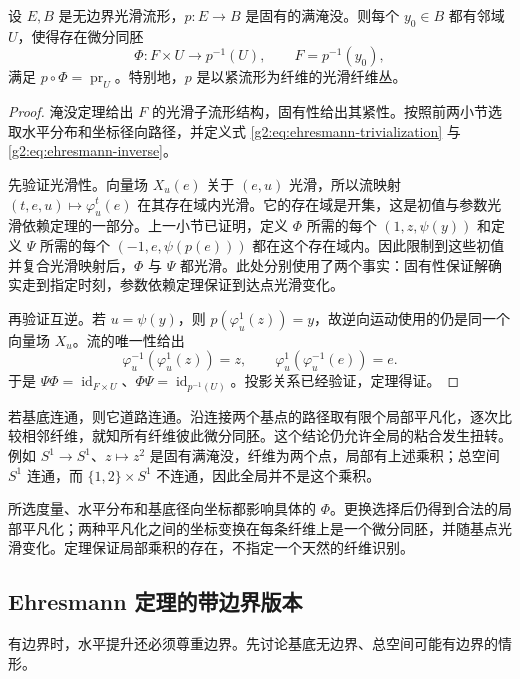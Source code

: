 \begin{theorem}[Ehresmann 定理]\label{g2:thm:ehresmann}
	设 \(E,B\) 是无边界光滑流形，\(p:E\to B\) 是固有的满淹没。则每个 \(y_0\in B\) 都有邻域 \(U\)，使得存在微分同胚
	\[
		\Phi:F\times U\longrightarrow p^{-1}(U),\qquad F=p^{-1}(y_0),
	\]
	满足 \(p\circ\Phi=\operatorname{pr}_U\)。特别地，\(p\) 是以紧流形为纤维的光滑纤维丛。
\end{theorem}
\begin{proof}
	淹没定理给出 \(F\) 的光滑子流形结构，固有性给出其紧性。按照前两小节选取水平分布和坐标径向路径，并定义式 \eqref{g2:eq:ehresmann-trivialization} 与 \eqref{g2:eq:ehresmann-inverse}。

	先验证光滑性。向量场 \(X_u(e)\) 关于 \((e,u)\) 光滑，所以流映射 \((t,e,u)\mapsto\varphi_u^t(e)\) 在其存在域内光滑。它的存在域是开集，这是初值与参数光滑依赖定理的一部分。上一小节已证明，定义 \(\Phi\) 所需的每个 \((1,z,\psi(y))\) 和定义 \(\Psi\) 所需的每个 \((-1,e,\psi(p(e)))\) 都在这个存在域内。因此限制到这些初值并复合光滑映射后，\(\Phi\) 与 \(\Psi\) 都光滑。此处分别使用了两个事实：固有性保证解确实走到指定时刻，参数依赖定理保证到达点光滑变化。

	再验证互逆。若 \(u=\psi(y)\)，则 \(p(\varphi_u^1(z))=y\)，故逆向运动使用的仍是同一个向量场 \(X_u\)。流的唯一性给出
	\[
		\varphi_u^{-1}(\varphi_u^1(z))=z,
		\qquad \varphi_u^1(\varphi_u^{-1}(e))=e.
	\]
	于是 \(\Psi\Phi=\operatorname{id}_{F\times U}\)、\(\Phi\Psi=\operatorname{id}_{p^{-1}(U)}\)。投影关系已经验证，定理得证。
\end{proof}

若基底连通，则它道路连通。沿连接两个基点的路径取有限个局部平凡化，逐次比较相邻纤维，就知所有纤维彼此微分同胚。这个结论仍允许全局的粘合发生扭转。例如 \(S^1\to S^1\)、\(z\mapsto z^2\) 是固有满淹没，纤维为两个点，局部有上述乘积；总空间 \(S^1\) 连通，而 \(\{1,2\}\times S^1\) 不连通，因此全局并不是这个乘积。

所选度量、水平分布和基底径向坐标都影响具体的 \(\Phi\)。更换选择后仍得到合法的局部平凡化；两种平凡化之间的坐标变换在每条纤维上是一个微分同胚，并随基点光滑变化。定理保证局部乘积的存在，不指定一个天然的纤维识别。

\subsection{Ehresmann 定理的带边界版本}
\label{g2:subsec:1506:05}

有边界时，水平提升还必须尊重边界。先讨论基底无边界、总空间可能有边界的情形。

